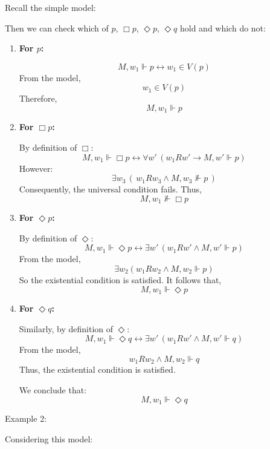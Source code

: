 \documentclass[12pt,a4paper,openany]{article}
\begin{document}
Recall the simple model:

Then we can check which of $p$, $\Box p$, $\Diamond p$, $\Diamond q$ hold and which do not:

\begin{enumerate}
    \item \textbf{For $p$:}
    
    $$M, w_1 \Vdash p \leftrightarrow w_1 \in V(p)$$
    From the model,
    $$w_1 \in V(p)$$
    Therefore,
    $$M, w_1 \Vdash p$$
    
    \item \textbf{For $\Box p$:}
    
    By definition of $\Box$:
    $$M, w_1 \Vdash \Box p \leftrightarrow \forall w' \, (w_1 R w' \to M, w' \Vdash p)$$
    However:
    $$\exists w_3 \, (\, w_1 R w_3 \wedge M, w_3 \nVdash p \,)$$
    Consequently, the universal condition fails.
    Thus,
    $$M, w_1 \nVdash \Box p$$
    
    \item \textbf{For $\Diamond p$:}
    
    By definition of $\Diamond$:
    $$M, w_1 \Vdash \Diamond p \leftrightarrow \exists w' \, (w_1 R w' \wedge M, w' \Vdash p)$$
    From the model,
    $$\exists w_2 (w_1 R w_2 \wedge M, w_2 \Vdash p)$$
    So the existential condition is satisfied.
    It follows that,
    $$M, w_1 \Vdash \Diamond p$$
    
    \item \textbf{For $\Diamond q$:}
    
    Similarly, by definition of $\Diamond$:
    $$M, w_1 \Vdash \Diamond q \leftrightarrow \exists w' \, (w_1 R w' \wedge M, w' \Vdash q)$$
    From the model,
    $$w_1 R w_2 \wedge M, w_2 \Vdash q$$
    Thus, the existential condition is satisfied.
    
    We conclude that:
    $$M, w_1 \Vdash \Diamond q$$
\end{enumerate}

Example 2:

Considering this model:

\begin{figure}[h]
\centering
{}
\end{figure}
\end{document}
